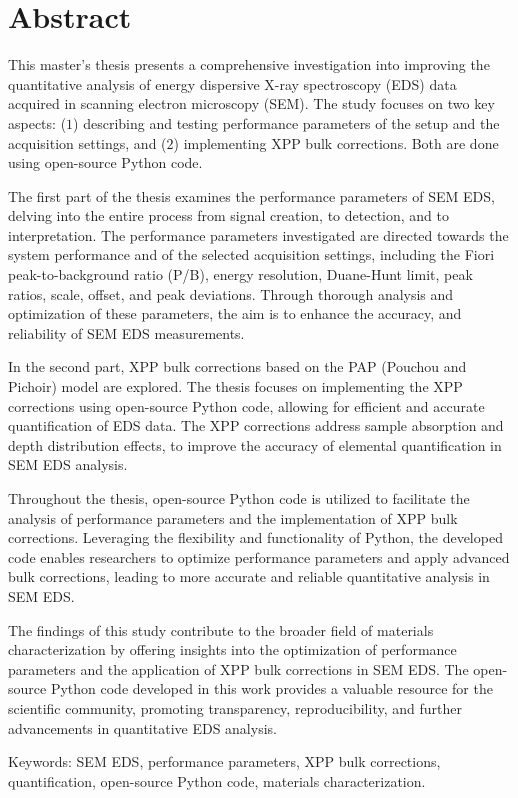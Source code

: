 \chapter*{Abstract}

\label{ch:abstract}

This master's thesis presents a comprehensive investigation into improving the quantitative analysis of energy dispersive X-ray spectroscopy (EDS) data acquired in scanning electron microscopy (SEM). 
The study focuses on two key aspects: ($1$) describing and testing performance parameters of the setup and the acquisition settings, and ($2$) implementing XPP bulk corrections.
Both are done using open-source Python code.

The first part of the thesis examines the performance parameters of SEM EDS, delving into the entire process from signal creation, to detection, and to interpretation. 
The performance parameters investigated are directed towards the system performance and of the selected acquisition settings, including the Fiori peak-to-background ratio (P/B), energy resolution, Duane-Hunt limit, peak ratios, scale, offset, and peak deviations. 
Through thorough analysis and optimization of these parameters, the aim is to enhance the accuracy, and reliability of SEM EDS measurements.

In the second part, XPP bulk corrections based on the PAP (Pouchou and Pichoir) model are explored. 
The thesis focuses on implementing the XPP corrections using open-source Python code, allowing for efficient and accurate quantification of EDS data. 
The XPP corrections address sample absorption and depth distribution effects, to improve the accuracy of elemental quantification in SEM EDS analysis.

Throughout the thesis, open-source Python code is utilized to facilitate the analysis of performance parameters and the implementation of XPP bulk corrections. 
Leveraging the flexibility and functionality of Python, the developed code enables researchers to optimize performance parameters and apply advanced bulk corrections, leading to more accurate and reliable quantitative analysis in SEM EDS.

The findings of this study contribute to the broader field of materials characterization by offering insights into the optimization of performance parameters and the application of XPP bulk corrections in SEM EDS. 
The open-source Python code developed in this work provides a valuable resource for the scientific community, promoting transparency, reproducibility, and further advancements in quantitative EDS analysis.

Keywords: SEM EDS, performance parameters, XPP bulk corrections, quantification, open-source Python code, materials characterization.
